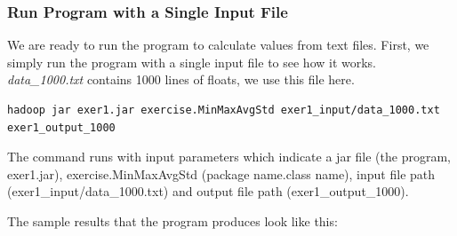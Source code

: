 \subsubsection{Run Program with a Single Input File}

We are ready to run the program to calculate values from text files. First, we
simply run the program with a single input file to see how it works.
\textit{data_1000.txt} contains 1000 lines of floats, we use this file here.

\begin{lstlisting}
hadoop jar exer1.jar exercise.MinMaxAvgStd exer1_input/data_1000.txt exer1_output_1000
\end{lstlisting}

The command runs with input parameters which indicate a jar file (the program,
exer1.jar), exercise.MinMaxAvgStd (package name.class name), input file path
(exer1_input/data_1000.txt) and output file path (exer1_output_1000).

The sample results that the program produces look like this:

